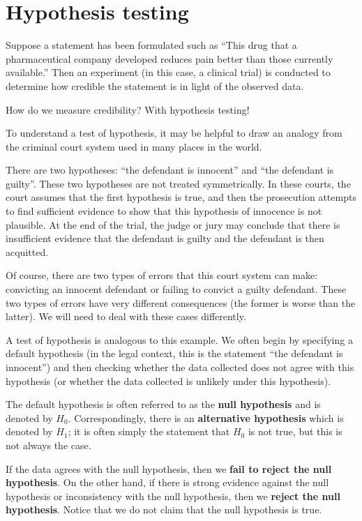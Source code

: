 \documentclass[10pt]{article}
\theoremstyle{newstyle}
\begin{document}
\newpage 
\section{Hypothesis testing}

Suppose a statement has been formulated such as ``This drug that a pharmaceutical company developed reduces pain better than those currently available.'' Then an experiment (in this case, a clinical trial) is conducted to determine how credible the statement is in light of the observed data.

How do we measure credibility? With hypothesis testing!

To understand a test of hypothesis, it may be helpful to draw an analogy from the criminal court system used in many places in the world.

There are two hypotheses: ``the defendant is innocent'' and ``the defendant is guilty''. These 
two hypotheses are not treated symmetrically. In these courts, the court assumes that the first hypothesis is true, and then the prosecution attempts to find sufficient evidence to show that this hypothesis of innocence is not plausible. At the end of the trial, the judge or jury may conclude that there is insufficient evidence that the defendant is guilty and the defendant is then acquitted. 

Of course, there are two types of errors that this court system can make: convicting an innocent defendant or failing to convict a guilty defendant. These two types of errors have very different consequences (the former is worse than the latter). We will need to deal with these cases differently.

A test of hypothesis is analogous to this example. We often begin by specifying a default hypothesis 
(in the legal context, this is the statement ``the defendant is innocent'') and then checking
whether the data collected does not agree with this hypothesis (or 
whether the data collected is unlikely under this hypothesis).

The default hypothesis is often referred to as the {\bf null hypothesis} and is denoted by $H_0$. 
Correspondingly, there is an {\bf alternative hypothesis} 
which is denoted by $H_1$; it is often simply the statement that 
$H_0$ is not true, but this is not always the case. 

If the data agrees with the null hypothesis, then we {\bf fail to reject the null hypothesis}. 
On the other hand, if there is strong evidence against the null hypothesis or inconsistency with the 
null hypothesis, then we {\bf reject the null hypothesis}. Notice that we do not claim that the 
null hypothesis is true. 
\end{document}
